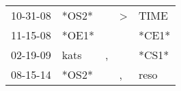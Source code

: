 \begin{supertabular}{p{0.07\textwidth}p{0.06\textwidth}p{0.02\textwidth}p{0.02\textwidth}p{0.06\textwidth}}
 10-31-08\textsuperscript{} &                   *OS2* &    &  \textgreater &  TIME\textsuperscript{} \\
 11-15-08\textsuperscript{} &                   *OE1* &    &               &                   *CE1* \\
 02-19-09\textsuperscript{} &  kats\textsuperscript{} &  , &               &                   *CS1* \\
 08-15-14\textsuperscript{} &                   *OS2* &    &             , &  reso\textsuperscript{} \\
\end{supertabular}
